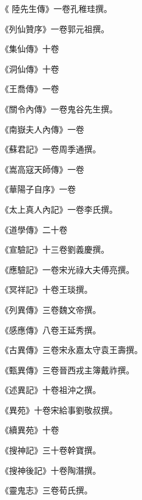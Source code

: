 \begin{pinyinscope}
 《
 陸先生傳》一卷孔稚珪撰。



 《列仙贊序》一卷郭元祖撰。



 《集仙傳》十卷



 《洞仙傳》十卷



 《王喬傳》一卷



 《關令內傳》一卷鬼谷先生撰。



 《南嶽夫人內傳》一卷



 《蘇君記》一卷周季通撰。



 《嵩高寇天師傳》一卷



 《華陽子自序》一卷



 《太上真人內記》一卷李氏撰。



 《道學傳》二十卷



 《宣驗記》十三卷劉義慶撰。



 《應驗記》一卷宋光祿大夫傅亮撰。



 《冥祥記》十卷王琰撰。



 《列異傳》三卷魏文帝撰。



 《感應傳》八卷王延秀撰。



 《古異傳》三卷宋永嘉太守袁王壽撰。



 《甄異傳》三卷晉西戎主簿戴祚撰。



 《述異記》十卷祖沖之撰。



 《異苑》十卷宋給事劉敬叔撰。



 《續異苑》十卷



 《搜神記》三十卷幹寶撰。



 《搜神後記》十卷陶潛撰。



 《靈鬼志》三卷荀氏撰。




\end{pinyinscope}
